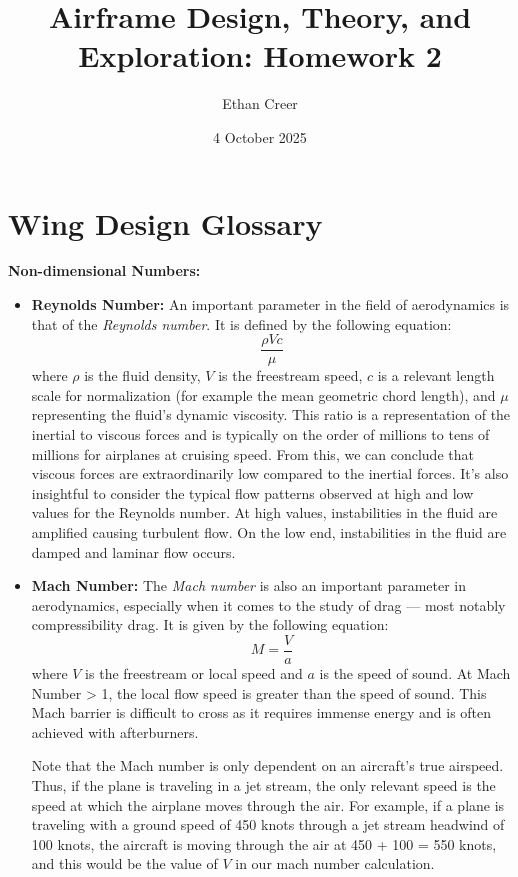 \documentclass{article}
\title{Airframe Design, Theory, and Exploration: Homework 2}
\author{Ethan Creer}
\date{4 October 2025}
\begin{document}
\maketitle
\section{Wing Design Glossary}

\textbf{Non-dimensional Numbers:}
\begin{itemize}
    \item[] \textbf{Reynolds Number:} An important parameter in the field of aerodynamics is that of the \textit{Reynolds number}. It is defined by the following equation:
        \begin{equation}
            \frac{\rho V c}{\mu}
        \end{equation}
        where $\rho$ is the fluid density, $V$ is the freestream speed, $c$ is a relevant length scale for normalization (for example the mean geometric chord length), and $\mu$ representing the fluid's dynamic viscosity.
        This ratio is a representation of the inertial to viscous forces and is typically on the order of millions to tens of millions for airplanes at cruising speed. From this, we can conclude that viscous forces are extraordinarily low compared to the inertial forces.
        It's also insightful to consider the typical flow patterns observed at high and low values for the Reynolds number. At high values, instabilities in the fluid are amplified causing turbulent flow. On the low end, instabilities in the fluid are damped and laminar flow occurs.
    \item[] \textbf{Mach Number:} The \textit{Mach number} is also an important parameter in aerodynamics, especially when it comes to the study of drag --- most notably compressibility drag.
    It is given by the following equation:
    \begin{equation}
    M = \frac{V}{a}
    \end{equation}
    where $V$ is the freestream or local speed and $a$ is the speed of sound. At Mach Number > 1, the local flow speed is greater than the speed of sound. This Mach barrier is difficult to cross as it requires immense energy
    and is often achieved with afterburners. 

    Note that the Mach number is only dependent on an aircraft's true airspeed. Thus, if the plane is traveling in a jet stream, the only relevant speed is the speed at which the airplane moves through the air. For example, if a plane is traveling with a ground speed of 450 knots through a jet stream headwind of 100 knots, the aircraft is moving through the air at 450 + 100 = 550 knots, and this would be the value of $V$ in our mach number calculation. 


\end{itemize}
\end{document}
